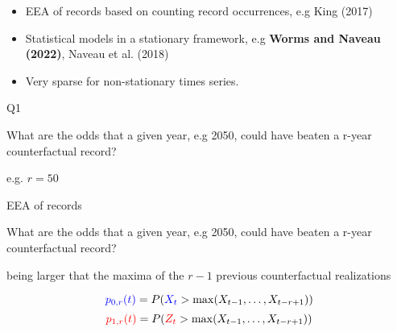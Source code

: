 \documentclass[9pt,compress]{beamer}
\begin{document}
\begin{frame}%
\begin{tcolorbox}[title= Literature on EEA for records ]
	\begin{itemize}
			\item EEA of records based on counting record occurrences, e.g King (2017) %
			\item Statistical models in a stationary framework, e.g {\bf \color{beamer@blendedblue} Worms and Naveau (2022)}, Naveau et al. (2018)
			\item Very sparse for non-stationary times series.
\end{itemize}
\end{tcolorbox}
\end{frame}
%
%
%
\begin{frame}{Q1}
\begin{center}
\LARGE {\color{beamer@blendedblue} What are the odds that a given year, e.g 2050, could have beaten a r-year counterfactual record?}
\end{center}
\vfill
e.g. $r= 50$
\end{frame}
%
%
%
\begin{frame}{EEA of records}
\begin{tcolorbox}[title= Question ]
What are the odds that a given year, e.g 2050, could have beaten a r-year counterfactual record?
\end{tcolorbox}
\begin{tcolorbox}[title= Event of interest : beat a r-year counterfactual record ]
being larger that the maxima of the $r-1$ previous {\color{blue}counterfactual} realizations
\end{tcolorbox}
\pause
\begin{tcolorbox}[title= Mathematical definition ]
$${\color{blue}p_{0,r}(t)} = P({\color{blue}X_t}> \max (X_{t-1},\dots, X_{t-r+1}))$$ 
$${\color{red}p_{1,r}(t)} = P({\color{red}Z_t}> \max (X_{t-1},\dots, X_{t-r+1}))$$ 
\end{tcolorbox}
\end{frame}
%
%
%
\end{document}
